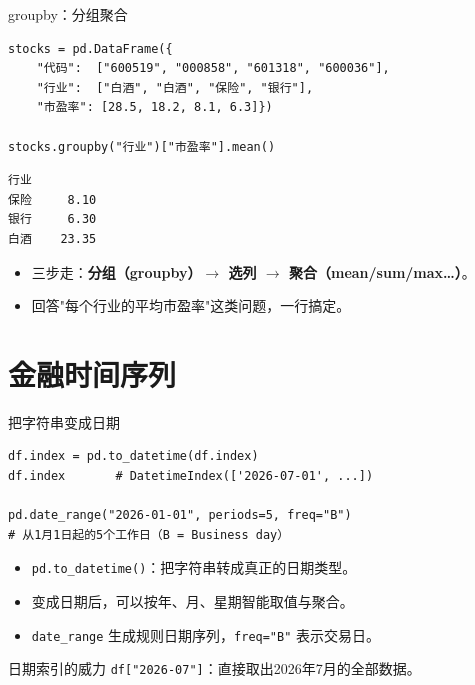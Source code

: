 \documentclass[9pt]{ctexbeamer}
\begin{document}
\begin{frame}[fragile]{groupby：分组聚合}
	\begin{lstlisting}
stocks = pd.DataFrame({
    "代码":  ["600519", "000858", "601318", "600036"],
    "行业":  ["白酒", "白酒", "保险", "银行"],
    "市盈率": [28.5, 18.2, 8.1, 6.3]})

stocks.groupby("行业")["市盈率"].mean()
\end{lstlisting}
	\begin{lstlisting}
行业
保险     8.10
银行     6.30
白酒    23.35
\end{lstlisting}
	\begin{itemize}
		\item 三步走：\textbf{分组（groupby）$\to$ 选列 $\to$ 聚合（mean/sum/max\ldots）}。
		\item 回答"每个行业的平均市盈率"这类问题，一行搞定。
	\end{itemize}
\end{frame}


\section{金融时间序列}

\begin{frame}[fragile]{把字符串变成日期}
	\begin{lstlisting}
df.index = pd.to_datetime(df.index)
df.index       # DatetimeIndex(['2026-07-01', ...])

pd.date_range("2026-01-01", periods=5, freq="B")
# 从1月1日起的5个工作日（B = Business day）
\end{lstlisting}
	\begin{itemize}
		\item \texttt{pd.to\_datetime()}：把字符串转成真正的日期类型。
		\item 变成日期后，可以按年、月、星期\alert{智能取值与聚合}。
		\item \texttt{date\_range} 生成规则日期序列，\texttt{freq="B"} 表示交易日。
	\end{itemize}
	\begin{exampleblock}{日期索引的威力}
		\texttt{df["2026-07"]}：直接取出2026年7月的全部数据。
	\end{exampleblock}
\end{frame}
\end{document}
